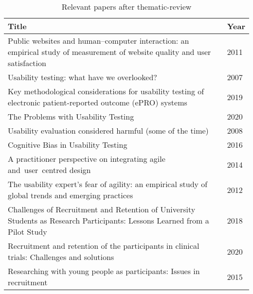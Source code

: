 \begin{table}[H]
\centering
\begin{tabular}{p{0.9125\linewidth}|p{0.0875\linewidth}}
\hline
\textbf{Title} & \textbf{Year} \\ \hline
Public websites and human–computer interaction: an empirical study of measurement of website quality and user satisfaction & 2011 \\
Usability testing: what have we overlooked? & 2007 \\
Key methodological considerations for usability testing of electronic patient-reported outcome (ePRO) systems & 2019 \\
The Problems with Usability Testing & 2020 \\
Usability evaluation considered harmful (some of the time) & 2008 \\
Cognitive Bias in Usability Testing & 2016 \\
A practitioner perspective on integrating agile and user centred design & 2014 \\
The usability expert's fear of agility: an empirical study of global trends and emerging practices & 2012 \\
Challenges of Recruitment and Retention of University Students as Research Participants: Lessons Learned from a Pilot Study & 2018 \\
Recruitment and retention of the participants in clinical trials: Challenges and solutions & 2020 \\
Researching with young people as participants: Issues in recruitment & 2015 \\ \hline
\end{tabular}
\caption{Relevant papers after thematic-review}
\label{tab:relevant-papers}
\end{table}


